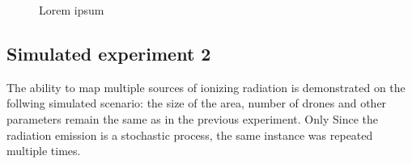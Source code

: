 {\begin{figure}[!htb]
{    \label{e2:sen2}
  }
  \newline
  \noindent
  \caption{Lorem ipsum}
  \label{fig:e2}
\end{figure}%
}

\subsection{Simulated experiment 2}
The ability to map multiple sources of ionizing radiation is demonstrated on the follwing simulated scenario:
the size of the area, number of drones and other parameters remain the same as in the previous experiment.
Only 
Since the radiation emission is a stochastic process, the same instance was repeated multiple times.




\newpage


